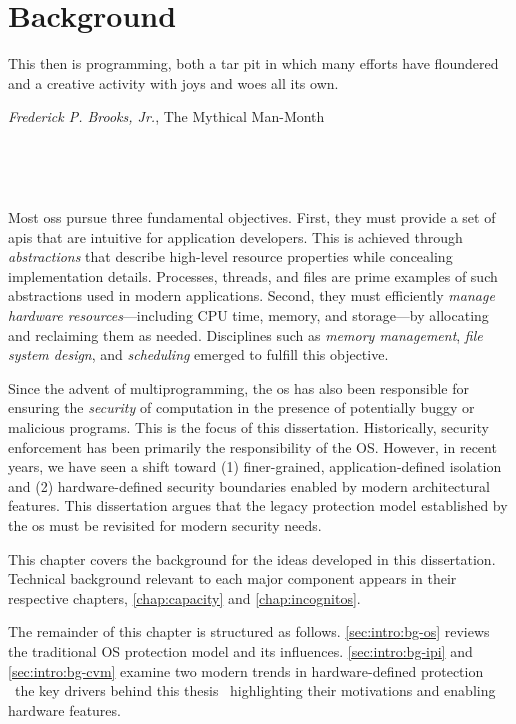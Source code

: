 
\glsresetall

\chapter{Background}\label{chap:background}

\epigraph{
	This then is programming, both a tar pit in which many efforts have floundered and a creative activity with joys and woes all its own.
}{\textit{Frederick P. Brooks, Jr.}, The Mythical Man-Month}

\

\


Most \glspl{os} pursue three fundamental objectives.
First, they must provide a set of \glspl{api} that are intuitive for application developers.
This is achieved through \emph{abstractions} that describe high-level resource properties while concealing implementation details.
Processes, threads, and files are prime examples of such abstractions used in modern applications.
Second, they must efficiently \emph{manage hardware resources}—including CPU time, memory, and storage—by allocating and reclaiming them as needed.
Disciplines such as \emph{memory management}, \emph{file system design}, and \emph{scheduling} emerged to fulfill this objective.

Since the advent of multiprogramming, the \gls{os} has also been responsible for ensuring the \emph{security} of computation in the presence of potentially buggy or malicious programs.
This is the focus of this dissertation.
Historically, security enforcement has been primarily the responsibility of the OS.
However, in recent years, we have seen a shift toward (1) finer-grained, application-defined isolation and (2) hardware-defined security boundaries enabled by modern architectural features.
This dissertation argues that the legacy protection model established by the \gls{os} must be revisited for modern security needs.

This chapter covers the background for the ideas developed in this dissertation.
Technical background relevant to each major component appears in their respective chapters, \cref{chap:capacity} and \cref{chap:incognitos}.

The remainder of this chapter is structured as follows.
\cref{sec:intro:bg-os} reviews the traditional OS protection model and its influences.
\cref{sec:intro:bg-ipi} and \cref{sec:intro:bg-cvm} examine two modern trends in hardware-defined protection \dash\ the key drivers behind this thesis \dash\ highlighting their motivations and enabling hardware features.


